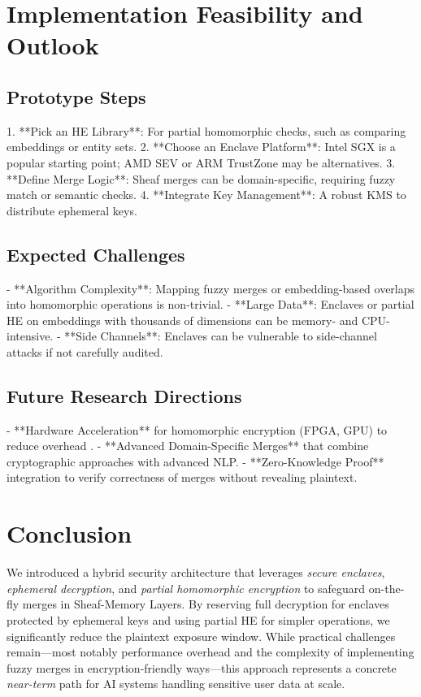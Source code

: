 \documentclass{article}
\begin{document}
\section{Implementation Feasibility and Outlook}

\subsection{Prototype Steps}
1. **Pick an HE Library**: For partial homomorphic checks, such as comparing embeddings or entity sets.  
2. **Choose an Enclave Platform**: Intel SGX is a popular starting point; AMD SEV or ARM TrustZone may be alternatives.  
3. **Define Merge Logic**: Sheaf merges can be domain-specific, requiring fuzzy match or semantic checks.  
4. **Integrate Key Management**: A robust KMS to distribute ephemeral keys.  

\subsection{Expected Challenges}
- **Algorithm Complexity**: Mapping fuzzy merges or embedding-based overlaps into homomorphic operations is non-trivial.  
- **Large Data**: Enclaves or partial HE on embeddings with thousands of dimensions can be memory- and CPU-intensive.  
- **Side Channels**: Enclaves can be vulnerable to side-channel attacks if not carefully audited.  

\subsection{Future Research Directions}
- **Hardware Acceleration** for homomorphic encryption (FPGA, GPU) to reduce overhead \citep{riazi2019heax}.  
- **Advanced Domain-Specific Merges** that combine cryptographic approaches with advanced NLP.  
- **Zero-Knowledge Proof** integration to verify correctness of merges without revealing plaintext.

\section{Conclusion}

We introduced a hybrid security architecture that leverages \emph{secure enclaves}, \emph{ephemeral decryption}, and \emph{partial homomorphic encryption} to safeguard on-the-fly merges in Sheaf-Memory Layers. By reserving full decryption for enclaves protected by ephemeral keys and using partial HE for simpler operations, we significantly reduce the plaintext exposure window. While practical challenges remain—most notably performance overhead and the complexity of implementing fuzzy merges in encryption-friendly ways—this approach represents a concrete \emph{near-term} path for AI systems handling sensitive user data at scale.
\end{document}
